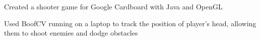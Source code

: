 \documentclass[]{deedy-resume-openfont}
\begin{document}
\begin{minipage}[t]{0.67\textwidth}
\begin{tightemize}
\item Created a shooter game for Google Cardboard with Java and OpenGL 
\item Used BoofCV running on a laptop to track the position of player’s head, allowing them to shoot enemies and dodge obstacles
\end{tightemize}
\sectionsep

\end{minipage} 
\end{document}
